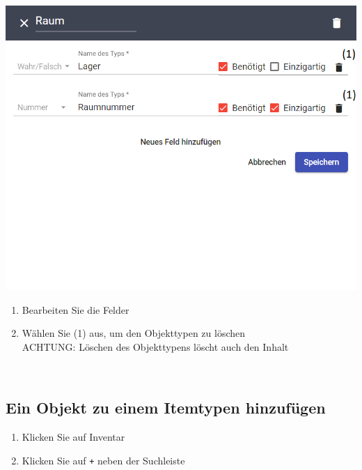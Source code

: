 \documentclass[11pt,a4paper]{report}
\begin{document}
	\begin{minipage}{0.4\linewidth}
	\includegraphics[scale=0.55]{Objekttypedit2.png}
	\end{minipage}
	\hfill
	\begin{minipage}{0.4\linewidth}
	\begin{enumerate}[5]
		\item Bearbeiten Sie die Felder
		\item Wählen Sie (1) aus, um den Objekttypen zu löschen\\
		ACHTUNG: Löschen des Objekttypens löscht auch den Inhalt
	\end{enumerate}
	\end{minipage}\\

	\subsection{Ein Objekt zu einem Itemtypen hinzufügen}

	\begin{enumerate}
		\item Klicken Sie auf \glqq{}Inventar\grqq{}
		\item Klicken Sie auf \texttt{+} neben der Suchleiste
	\end{enumerate}\\
\end{document}
